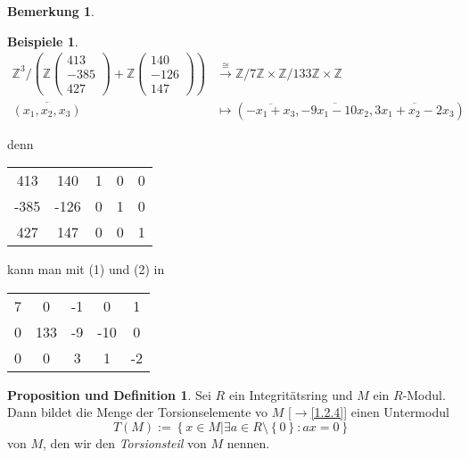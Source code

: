 \documentclass[
twoside=semi,
fontsize=12,
DIV=12, 
cleardoublepage=current,
leqno,
headings=optiontoheadandtoc, 
toc=idx
]{scrbook}
\newcommand{\Z}{\mathbb{Z}}
\newcommand{\brac}[1]{\left( #1 \right)}
\newcommand{\set}[1]{\left\{ #1 \right\}}
\theoremstyle{definition}
\newtheorem{bemerkung}[definition]{Bemerkung}
\newtheorem{beispiele}[definition]{Beispiele}
\newtheorem{prop-def}[definition]{Proposition und Definition}
\begin{document}
\begin{bemerkung}
		\begin{beispiele}\label{1.6.7}
			\begin{align*}
				\Z^3 / \brac{\Z\begin{pmatrix}
						413\\-385\\427
					\end{pmatrix} + \Z\begin{pmatrix}
						140\\-126\\147
				\end{pmatrix}} &\overset{\cong}{\to} \Z/7\Z \times \Z/133\Z \times \Z\\
				\overline{(x_1, x_2, x_3)} &\mapsto (\overline{-x_1+x_3}, \overline{-9x_1-10x_2},\overline{3x_1+x_2-2x_3})
			\end{align*}
			
			denn \begin{tabular}{|cc|ccc|}\hline
			413& 140 & 1 & 0 & 0\\
			-385& -126 & 0 & 1 & 0\\
			427& 147 & 0 & 0 & 1\\\hline
		\end{tabular} kann man mit (1) und (2) in \begin{tabular}{|cc|ccc|}\hline
			7& 0 & -1 & 0 & 1\\
			0& 133 & -9 &-10 & 0\\
			0& 0 & 3 & 1 & -2\\\hline
		\end{tabular}
		
		\end{beispiele}
	\end{bemerkung}

	\begin{prop-def}\label{1.6.8}
		Sei $R$ ein Integrit\"atsring und $M$ ein $R$-Modul. Dann bildet die Menge der Torsionselemente vo $M$ [$\to$\ref{1.2.4}] einen Untermodul
			\[T(M):= \set{x \in M| \exists a \in R \setminus \set{0}: ax = 0}\]
		von $M$, den wir den \emph{Torsionsteil} von $M$ nennen.
	\end{prop-def}
\backmatter
\printindex
\end{document}
